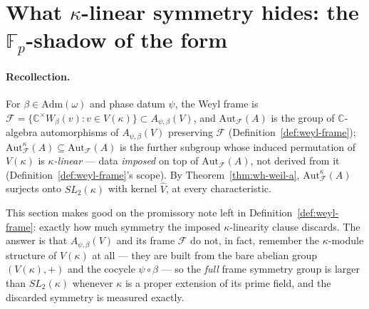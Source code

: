 \section{What \texorpdfstring{$\kappa$}{kappa}-linear symmetry hides: the \texorpdfstring{$\mathbb{F}_p$}{Fp}-shadow of the form}
\label{sec:fp-symmetry}

\paragraph{Recollection.} For $\beta\in\mathrm{Adm}(\omega)$ and phase datum
$\psi$, the Weyl frame is
$\mathcal{F} = \{\mathbb{C}^\times W_\beta(v) : v\in V(\kappa)\} \subset A_{\psi,\beta}(V)$,
and $\mathrm{Aut}_{\mathcal{F}}(A)$ is the group of $\mathbb{C}$-algebra
automorphisms of $A_{\psi,\beta}(V)$ preserving $\mathcal{F}$
(Definition~\ref{def:weyl-frame}); $\mathrm{Aut}_{\mathcal{F}}^\kappa(A) \subseteq \mathrm{Aut}_{\mathcal{F}}(A)$
is the further subgroup whose induced permutation of $V(\kappa)$ is
\emph{$\kappa$-linear} — data \emph{imposed} on top of
$\mathrm{Aut}_{\mathcal{F}}(A)$, not derived from it
(Definition~\ref{def:weyl-frame}'s scope). By
Theorem~\ref{thm:wh-weil-a}, $\mathrm{Aut}_{\mathcal{F}}^\kappa(A)$ surjects
onto $SL_2(\kappa)$ with kernel $\hat V$, at every characteristic.

This section makes good on the promissory note left in
Definition~\ref{def:weyl-frame}: exactly how much symmetry the imposed
$\kappa$-linearity clause discards. The answer is that $A_{\psi,\beta}(V)$
and its frame $\mathcal{F}$ do not, in fact, remember the $\kappa$-module
structure of $V(\kappa)$ at all — they are built from the bare abelian group
$(V(\kappa),+)$ and the cocycle $\psi\circ\beta$ — so the \emph{full} frame
symmetry group is larger than $SL_2(\kappa)$ whenever $\kappa$ is a proper
extension of its prime field, and the discarded symmetry is measured
exactly.

